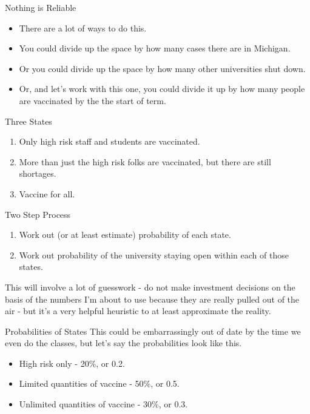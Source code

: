 \documentclass[
  ignorenonframetext,
]{beamer}
\providecommand{\tightlist}{%
  \setlength{\itemsep}{0pt}\setlength{\parskip}{0pt}}
\begin{document}
\begin{frame}{Nothing is Reliable}
\protect\hypertarget{nothing-is-reliable}{}
\begin{itemize}[<+->]
\tightlist
\item
  There are a lot of ways to do this.
\item
  You could divide up the space by how many cases there are in Michigan.
\item
  Or you could divide up the space by how many other universities shut
  down.
\item
  Or, and let's work with this one, you could divide it up by how many
  people are vaccinated by the the start of term.
\end{itemize}
\end{frame}

\begin{frame}{Three States}
\protect\hypertarget{three-states}{}
\begin{enumerate}
\tightlist
\item
  Only high risk staff and students are vaccinated.
\item
  More than just the high risk folks are vaccinated, but there are still
  shortages.
\item
  Vaccine for all.
\end{enumerate}
\end{frame}

\begin{frame}{Two Step Process}
\protect\hypertarget{two-step-process}{}
\begin{enumerate}
\tightlist
\item
  Work out (or at least estimate) probability of each state.
\item
  Work out probability of the university staying open within each of
  those states.
\end{enumerate}

This will involve a lot of guesswork - do not make investment decisions
on the basis of the numbers I'm about to use because they are really
pulled out of the air - but it's a very helpful heuristic to at least
approximate the reality.
\end{frame}

\begin{frame}{Probabilities of States}
\protect\hypertarget{probabilities-of-states}{}
This could be embarrassingly out of date by the time we even do the
classes, but let's say the probabilities look like this.

\begin{itemize}
\tightlist
\item
  High risk only - 20\%, or 0.2.
\item
  Limited quantities of vaccine - 50\%, or 0.5.
\item
  Unlimited quantities of vaccine - 30\%, or 0.3.
\end{itemize}
\end{frame}
\end{document}

